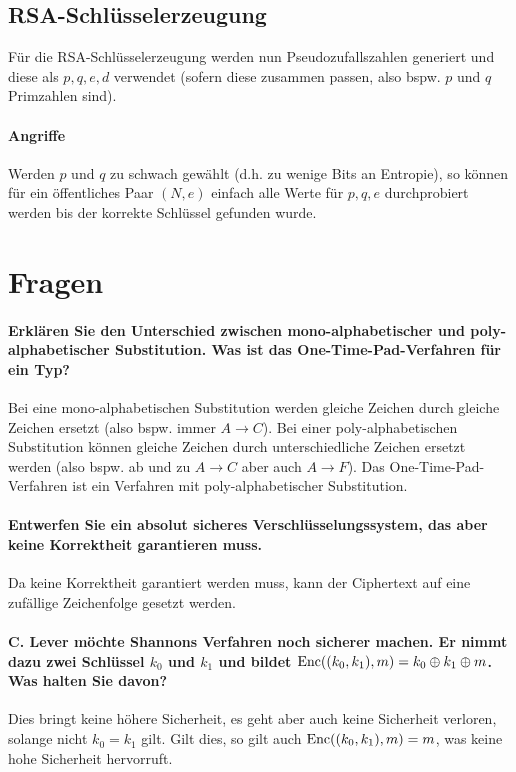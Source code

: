 	\subsection{RSA-Schlüsselerzeugung}
		Für die RSA-Schlüsselerzeugung werden nun Pseudozufallszahlen generiert und diese als \( p, q, e, d \) verwendet (sofern diese zusammen passen, also bspw. \(p\) und \(q\) Primzahlen sind).

		\paragraph{Angriffe}
			Werden \(p\) und \(q\) zu schwach gewählt (d.h. zu wenige Bits an Entropie), so können für ein öffentliches Paar \( (N, e) \) einfach alle Werte für \( p, q, e \) durchprobiert werden bis der korrekte Schlüssel gefunden wurde.

\section{Fragen}
\paragraph{Erklären Sie den Unterschied zwischen mono-alphabetischer und poly-alphabetischer Substitution. Was ist das One-Time-Pad-Verfahren für ein Typ?}
Bei eine mono-alphabetischen Substitution werden gleiche Zeichen durch gleiche Zeichen ersetzt (also bspw. immer \( A \rightarrow C \)). Bei einer poly-alphabetischen Substitution können gleiche Zeichen durch unterschiedliche Zeichen ersetzt werden (also bspw. ab und zu \( A \rightarrow C \) aber auch \( A \rightarrow F \)). Das One-Time-Pad-Verfahren ist ein Verfahren mit poly-alphabetischer Substitution.

\paragraph{Entwerfen Sie ein absolut sicheres Verschlüsselungssystem, das aber keine Korrektheit garantieren muss.}
Da keine Korrektheit garantiert werden muss, kann der Ciphertext auf eine zufällige Zeichenfolge gesetzt werden.

\paragraph{C. Lever möchte Shannons Verfahren noch sicherer machen. Er nimmt dazu zwei Schlüssel \(k_0\) und \(k_1\) und bildet \(\operatorname{Enc}((k_0, k_1), m) = k_0 \oplus k_1 \oplus m\). Was halten Sie davon?}
Dies bringt keine höhere Sicherheit, es geht aber auch keine Sicherheit verloren, solange nicht \( k_0 = k_1 \) gilt. Gilt dies, so gilt auch \( \operatorname{Enc}((k_0, k_1), m) = m \), was keine hohe Sicherheit hervorruft.

